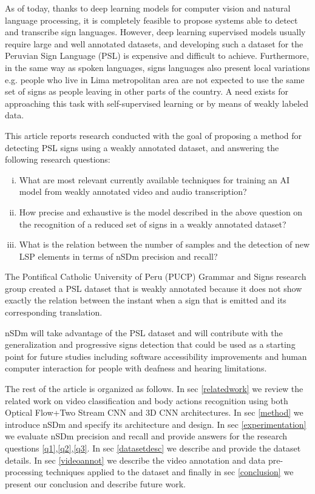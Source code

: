 \documentclass[twocolumn,conference]{article}
\begin{document}
As of today, thanks to deep learning models for computer vision and natural language processing, it is completely feasible to propose systems able to detect and transcribe sign languages. However, deep learning supervised models usually require large and well annotated datasets, and developing such a dataset for the Peruvian Sign Language (PSL) \cite{lsp_2015} is expensive and difficult to achieve. Furthermore, in the same way as spoken languages, signs languages also present local variations e.g. people who live in Lima metropolitan area are not expected to use the same set of signs as people leaving in other parts of the country. A need exists for approaching this task with self-supervised learning or by means of weakly labeled data.

This article reports research conducted with the goal of proposing a method for detecting PSL signs using a weakly annotated dataset, and answering the following research questions:

\begin{enumerate}[(i)]
\item What are most relevant currently available techniques for training an AI model from  weakly annotated video and audio transcription?\label{q1}
\item How precise and exhaustive is the model described in the above question on the recognition of a reduced set of signs in a weakly annotated dataset?\label{q2}
\item What is the relation between the number of samples and the detection of new LSP elements in terms of nSDm precision and recall?\label{q3}
\end{enumerate}

The Pontifical Catholic University of Peru (PUCP) Grammar and  Signs research group created a PSL dataset \cite{lsp_dataset} that is weakly annotated because it does not show exactly the relation between the instant when a sign that is emitted and its corresponding translation.

nSDm will take advantage of the PSL dataset \cite{lsp_dataset} and will contribute with the generalization and progressive signs detection that could be used as a starting point for future studies including software accessibility improvements and human computer interaction for people with deafness and hearing limitations.

The rest of the article is organized as follows. In sec \ref{relatedwork} we review the related work on video classification and body actions recognition using both Optical Flow+Two Stream CNN and 3D CNN architectures. In sec \ref{method} we introduce nSDm and specify its architecture and design. In sec \ref{experimentation} we evaluate nSDm precision and recall and provide answers for the research questions \ref{q1},\ref{q2},\ref{q3}. In sec \ref{datasetdesc} we describe and provide the dataset details. In sec \ref{videoannot} we describe the video annotation and data pre-processing techniques applied to the dataset and finally in sec \ref{conclusion} we present our conclusion and describe future work.
\end{document}
